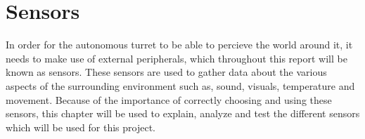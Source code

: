 \chapter{Sensors}\label{sensors}
In order for the autonomous turret to be able to percieve the world around it,
it needs to make use of external peripherals, which throughout this report will
be known as sensors. These sensors are used to gather data about the various
aspects of the surrounding environment such as, sound, visuals, temperature and
movement. Because of the importance of correctly choosing and using these
sensors, this chapter will be used to explain, analyze and test the different
sensors which will be used for this project.

 
